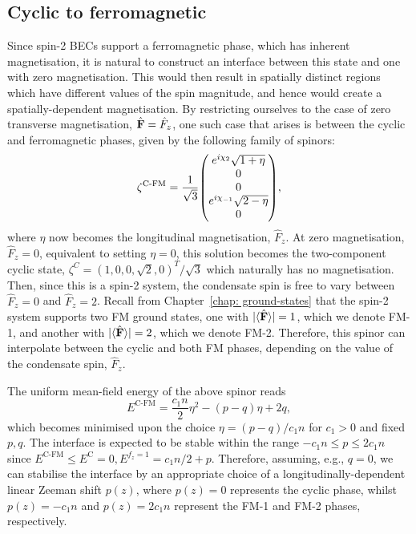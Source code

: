 \subsection{Cyclic to ferromagnetic}
Since spin-2 BECs support a ferromagnetic phase, which has inherent
magnetisation, it is natural to construct an interface between this state and
one with zero magnetisation.
This would then result in spatially distinct regions which have different values
of the spin magnitude, and hence would create a spatially-dependent
magnetisation.
By restricting ourselves to the case of zero transverse magnetisation,
\(\hat{\vb{F}} = \hat{F}_z\), one such case that arises is between the cyclic
and ferromagnetic phases, given by the following family of spinors:
\begin{align}\label{eq: C-FM-interpolating-spinor}
    \zeta^\text{C-FM} = \frac{1}{\sqrt{3}}\mqty(
        e^{i\chi_2}\sqrt{1 + \eta} \\
        0 \\
        0 \\
        e^{i\chi_{-1}}\sqrt{2 - \eta} \\
        0
    ),
\end{align}
where \(\eta \) now becomes the longitudinal magnetisation, \(\hat{F}_z\).
At zero magnetisation, \(\hat{F}_z = 0\), equivalent to setting \(\eta=0\), this
solution becomes the two-component cyclic state,
\(\zeta^C = {(1, 0, 0, \sqrt{2}, 0)}^T/\sqrt{3}\) which naturally has no
magnetisation.
Then, since this is a spin-2 system, the condensate spin is free to vary between
\(\hat{F}_z = 0\) and \(\hat{F}_z = 2\).
Recall from Chapter~\ref{chap: ground-states} that the spin-2 system supports
two FM ground states, one with \(|\langle \hat{\vb{F}} \rangle | = 1\), which we denote
FM-1, and another with \(|\langle \hat{\vb{F}} \rangle | = 2\), which we denote FM-2.
Therefore, this spinor can interpolate between the cyclic and both FM phases,
depending on the value of the condensate spin, \(\hat{F}_z\).

The uniform mean-field energy of the above spinor reads
\begin{equation}
    E^\text{C-FM} = \frac{c_1 n}{2} \eta^2 - (p-q)\eta + 2q,
\end{equation}
which becomes minimised upon the choice \(\eta = (p-q)/c_1n\) for \(c_1 > 0\)
and fixed \(p, q\).
The interface is expected to be stable within the range
\(-c_1n \leq p \leq 2c_1n\) since \(E^\text{C-FM} \leq
E^\text{C}=0, E^{f_z=1} = c_1n/2 + p\).
Therefore, assuming, e.g., \(q=0\), we can stabilise the interface by an
appropriate choice of a longitudinally-dependent linear Zeeman shift \(p(z)\),
where \(p(z) = 0\) represents the cyclic phase, whilst \(p(z) = -c_1n\) and
\(p(z) = 2c_1n\) represent the FM-1 and FM-2 phases,
respectively.


